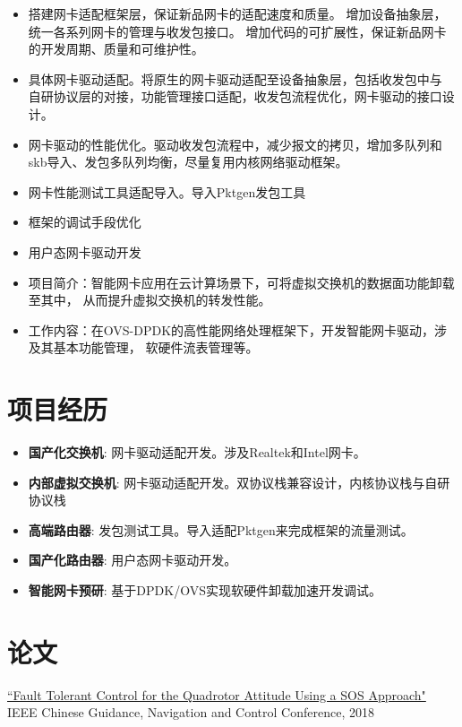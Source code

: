 \documentclass{resume}
\begin{document}
    \begin{itemize}[parsep=0.5ex]
        \item 搭建网卡适配框架层，保证新品网卡的适配速度和质量。
        增加设备抽象层，统一各系列网卡的管理与收发包接口。
        增加代码的可扩展性，保证新品网卡的开发周期、质量和可维护性。
        \item 具体网卡驱动适配。将原生的网卡驱动适配至设备抽象层，包括收发包中与
        自研协议层的对接，功能管理接口适配，收发包流程优化，网卡驱动的接口设计。
        \item 网卡驱动的性能优化。驱动收发包流程中，减少报文的拷贝，增加多队列和skb导入、发包多队列均衡，尽量复用内核网络驱动框架。
        \item 网卡性能测试工具适配导入。导入Pktgen发包工具
        \item 框架的调试手段优化
        \item 用户态网卡驱动开发
    \end{itemize}

    \par

    \begin{itemize}[parsep=0.5ex]
        \item 项目简介：智能网卡应用在云计算场景下，可将虚拟交换机的数据面功能卸载至其中，
              从而提升虚拟交换机的转发性能。
        \item 工作内容：在OVS-DPDK的高性能网络处理框架下，开发智能网卡驱动，涉及其基本功能管理，
              软硬件流表管理等。
    \end{itemize}

    \sepspace

\section{项目经历}

    \begin{itemize}[parsep=0.5ex]
        \item \textbf{国产化交换机}: 网卡驱动适配开发。涉及Realtek和Intel网卡。
        \item \textbf{内部虚拟交换机}: 网卡驱动适配开发。双协议栈兼容设计，内核协议栈与自研协议栈
        \item \textbf{高端路由器}: 发包测试工具。导入适配Pktgen来完成框架的流量测试。
        \item \textbf{国产化路由器}: 用户态网卡驱动开发。
        \item \textbf{智能网卡预研}: 基于DPDK/OVS实现软硬件卸载加速开发调试。
    \end{itemize}
	\normalsize \par

\section{论文}

\href{https://ieeexplore.ieee.org/abstract/document/9019181}{``Fault Tolerant Control for the Quadrotor Attitude Using a SOS Approach"} IEEE Chinese Guidance, Navigation and Control Conference, 2018
\end{document}
